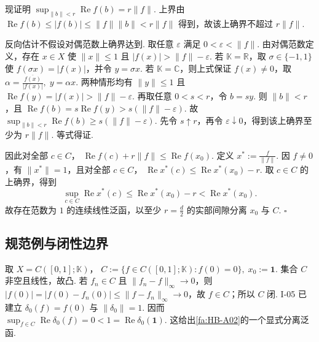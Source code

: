 \begin{FAProof}
现证明 \(\displaystyle \sup_{\|b\|<r}\operatorname{Re}f(b) =r\|f\|\).
上界由 \(\displaystyle \operatorname{Re}f(b) \leqslant|f(b)| \leqslant\|f\|\|b\| <r\|f\|\)
得到，故该上确界不超过 \(\displaystyle r\|f\|\).

反向估计不假设对偶范数上确界达到. 取任意 \(\displaystyle \varepsilon\) 满足 \(\displaystyle0<\varepsilon<\|f\|\). 由对偶范数定义，存在 \(\displaystyle x\in X\) 使 \(\displaystyle \|x\|\leqslant1\) 且 \(\displaystyle |f(x)|>\|f\|-\varepsilon\).
若 \(\displaystyle \mathbb K=\mathbb R\)，取 \(\displaystyle \sigma\in\{-1,1\}\) 使 \(\displaystyle f(\sigma x)=|f(x)|\)，并令 \(\displaystyle y=\sigma x\). 若 \(\displaystyle \mathbb K=\mathbb C\)，则上式保证 \(\displaystyle f(x)\neq0\)，取 \(\displaystyle \alpha=\frac{\overline{f(x)}}{|f(x)|}, \; y=\alpha x\).
两种情形均有 \(\displaystyle \|y\|\leqslant1\) 且 \(\displaystyle \operatorname{Re}f(y)=|f(x)|>\|f\|-\varepsilon\).
再取任意 \(\displaystyle0<s<r\)，令 \(\displaystyle b=sy\). 则 \(\displaystyle \|b\|<r\)，且 \(\displaystyle \operatorname{Re}f(b) =s\operatorname{Re}f(y) >s(\|f\|-\varepsilon)\).
故 \(\displaystyle \sup_{\|b\|<r}\operatorname{Re}f(b) \geqslant s(\|f\|-\varepsilon)\).
先令 \(\displaystyle s\uparrow r\)，再令 \(\displaystyle \varepsilon\downarrow0\)，得到该上确界至少为 \(\displaystyle r\|f\|\). 等式得证.

因此对全部 \(\displaystyle c\in C\)， \(\displaystyle \operatorname{Re}f(c)+r\|f\| \leqslant \operatorname{Re}f(x_0)\).
定义 \(\displaystyle x^*:=\frac{f}{\|f\|}\).
因 \(\displaystyle f\neq0\)，有 \(\displaystyle \|x^*\|=1\)，且对全部 \(\displaystyle c\in C\)， \(\displaystyle \operatorname{Re}x^*(c) \leqslant \operatorname{Re}x^*(x_0)-r\).
取 \(\displaystyle c\in C\) 的上确界，得到
\[
\sup_{c\in C}\operatorname{Re}x^*(c)
\leqslant
\operatorname{Re}x^*(x_0)-r
<
\operatorname{Re}x^*(x_0).
\]
故存在范数为 \(\displaystyle1\) 的连续线性泛函，以至少 \(\displaystyle r=\frac{d}{2}\) 的实部间隙分离 \(\displaystyle x_0\) 与 \(\displaystyle C\).
\hfill\(\square\)
\end{FAProof}


\newpage
\subsection{规范例与闭性边界}

\begin{FAExample}[闭超平面的分离]\label{i06:closed-hyperplane-example}
取 \(\displaystyle X=C([0,1];\mathbb K)\)， \(\displaystyle C:=\{f\in C([0,1];\mathbb K):f(0)=0\}, \; x_0:=\mathbf1\).
集合 \(\displaystyle C\) 非空且线性，故凸. 若 \(\displaystyle f_n\in C\) 且 \(\displaystyle \|f_n-f\|_\infty\to0\)，则 \(\displaystyle |f(0)|=|f(0)-f_n(0)|\leqslant\|f-f_n\|_\infty\to0\)，故 \(\displaystyle f\in C\)；所以 \(\displaystyle C\) 闭. I-05 已建立 \(\displaystyle \delta_0(f)=f(0)\) 与 \(\displaystyle \|\delta_0\|=1\). 因而 \(\displaystyle \sup_{f\in C}\operatorname{Re}\delta_0(f) =0 <1 =\operatorname{Re}\delta_0(\mathbf1)\).
这给出\autoref{fa:HB-A02}的一个显式分离泛函.
\end{FAExample}

